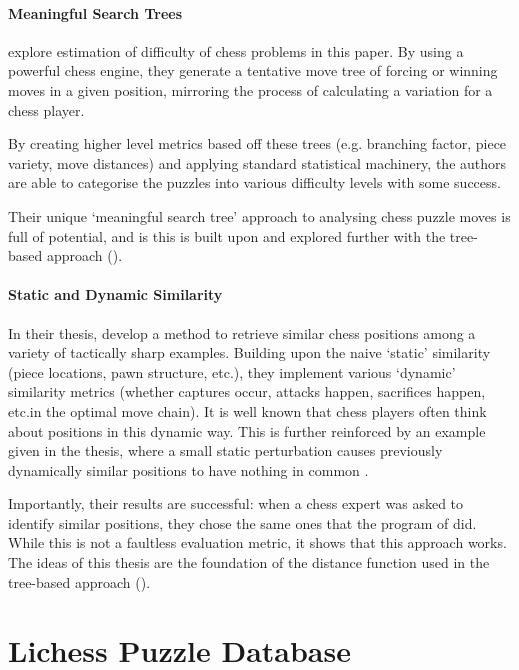 \paragraph{Meaningful Search Trees}\citet{chessTrees} explore estimation of
difficulty of chess problems in this paper. By using a powerful chess engine,
they generate a tentative move tree of forcing or winning moves in a given
position, mirroring the process of calculating a variation for a chess player. 

By creating higher level metrics based off these trees (e.g. branching factor,
piece variety, move distances) and applying standard statistical machinery, the
authors are able to categorise the puzzles into various difficulty levels with
some success.

Their unique `meaningful search tree' \citep{chessTrees} approach to analysing
chess puzzle moves is full of potential, and is this is built upon and explored
further with the tree-based approach ().

\paragraph{Static and Dynamic Similarity}In their thesis, \citet{chessMotifs}
develop a method to retrieve similar chess positions among a variety of
tactically sharp examples. Building upon the naive `static' similarity (piece
locations, pawn structure, etc.\@), they implement various `dynamic' similarity
metrics (whether captures occur, attacks happen, sacrifices happen, etc.\@ in
the optimal move chain). It is well known \citep{thoughtAndChoice,
bilalic2010mechanisms} that chess players often think about positions in this
dynamic way. This is further reinforced by an example given in the thesis,
where a small static perturbation causes previously dynamically similar
positions to have nothing in common \citep{chessMotifs}.

Importantly, their results are successful: when a chess expert was asked to
identify similar positions, they chose the same ones that the program of
\cite{chessMotifs} did. While this is not a faultless evaluation metric, it
shows that this approach works. The ideas of this thesis are the foundation of
the distance function used in the tree-based approach ().

\section{Lichess Puzzle Database}\label{lichessPuzzlesSection}\label{bg5}

